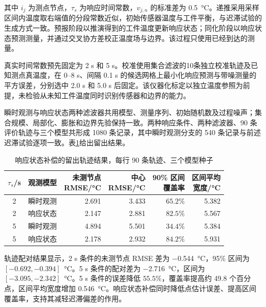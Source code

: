 其中 $i_j$ 为测点节点，$\tau_s$ 为响应时间常数，$v_{j,n}$ 的标准差为 \SI{0.5}{\degreeCelsius}。递推采用采样区间内温度取右端值的分段常数近似，初始传感器温度与工件平衡，与迟滞试验的生成方式一致。预报阶段以推演得到的工件温度更新响应状态；同化阶段以响应状态预测测量，并通过交叉协方差校正温度场与边界。该过程只使用已经到达的测量。

真实时间常数预先固定为 2 s 和 5 s。校准使用集合滤波的10条独立校准轨迹及已知测点真温度，在 0--8 s、间隔 0.1 s 的候选网格上最小化响应预测与带噪测量的平方误差，分别选中 2.0 s 和 5.0 s 后固定。该仪器化标定以独立温度参照为前提，未检验从未知工件温度同时识别传感器和边界的能力。

瞬时观测与响应状态两种滤波器共用模型、测量序列、初始随机数及过程噪声；集合规模、局部化、膨胀和边界先验保持一致。两种响应条件、两种滤波器、90 条评价轨迹与三个模型共形成 1080 条记录，其中瞬时观测分支的 540 条记录与前述迟滞试验逐项一致。表\ref{tab:sensor_response}给出留出结果。

\begin{table}[H]
  \centering
  \caption{响应状态补偿的留出轨迹结果，每行 90 条轨迹、三个模型种子}
  \label{tab:sensor_response}
  \small
  \begin{tabular}{clrrrr}
    \toprule
    $\tau_s$/s & 观测模型 & \shortstack{未测节点\\RMSE/°C} & \shortstack{中心\\RMSE/°C} & \shortstack{90\% 区间\\覆盖率} & \shortstack{区间平均\\宽度/°C} \\
    \midrule
    2 & 瞬时观测 & 2.691 & 3.433 & $65.2\%$ & 5.382 \\
    2 & 响应状态 & 2.147 & 2.881 & $82.5\%$ & 5.567 \\
    5 & 瞬时观测 & 4.894 & 5.501 & $34.4\%$ & 5.384 \\
    5 & 响应状态 & 2.178 & 2.932 & $84.2\%$ & 5.931 \\
    \bottomrule
  \end{tabular}
\end{table}

轨迹配对结果显示，2 s 条件的未测节点 RMSE 差为 \SI{-0.544}{\degreeCelsius}，95\% 区间为 $[-0.692,-0.394]$~\si{\degreeCelsius}。5 s 条件的配对差为 \SI{-2.716}{\degreeCelsius}，区间为 $[-3.095,-2.342]$~\si{\degreeCelsius}。5 s 条件的误差降低 $55.5\%$，覆盖率提高约 49.8 个百分点，区间平均宽度增加 \SI{0.546}{\degreeCelsius}。响应状态补偿同时降低点估计误差、提高区间覆盖率，支持其减轻迟滞偏差的作用。


